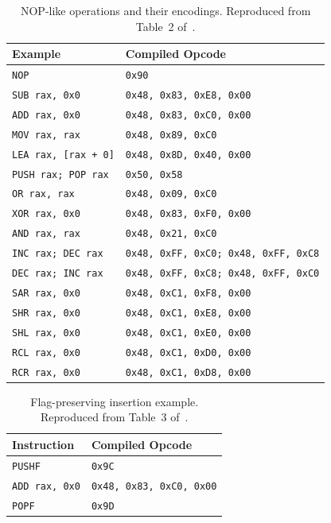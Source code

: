 \documentclass[runningheads]{llncs}
\begin{document}
\begin{table}[t]
    \caption{NOP-like operations and their encodings. Reproduced from Table~2 of~\cite{zone_secrypt_2026}.}
    \label{tab:nop_instructions}
    \small
    \centering
    \setlength{\tabcolsep}{3pt}
    \begin{tabular}{ll}
        \hline
        \textbf{Example} & \textbf{Compiled Opcode} \\ \hline
        \verb|NOP| & \verb|0x90| \\ \hline
        \verb|SUB rax, 0x0| & \verb|0x48, 0x83, 0xE8, 0x00| \\ \hline
        \verb|ADD rax, 0x0| & \verb|0x48, 0x83, 0xC0, 0x00| \\ \hline
        \verb|MOV rax, rax| & \verb|0x48, 0x89, 0xC0| \\ \hline
        \verb|LEA rax, [rax + 0]| & \verb|0x48, 0x8D, 0x40, 0x00| \\ \hline
        \verb|PUSH rax; POP rax| & \verb|0x50, 0x58| \\ \hline
        \verb|OR rax, rax| & \verb|0x48, 0x09, 0xC0| \\ \hline
        \verb|XOR rax, 0x0| & \verb|0x48, 0x83, 0xF0, 0x00| \\ \hline
        \verb|AND rax, rax| & \verb|0x48, 0x21, 0xC0| \\ \hline
        \verb|INC rax; DEC rax| & \verb|0x48, 0xFF, 0xC0; 0x48, 0xFF, 0xC8| \\ \hline
        \verb|DEC rax; INC rax| & \verb|0x48, 0xFF, 0xC8; 0x48, 0xFF, 0xC0| \\ \hline
        \verb|SAR rax, 0x0| & \verb|0x48, 0xC1, 0xF8, 0x00| \\ \hline
        \verb|SHR rax, 0x0| & \verb|0x48, 0xC1, 0xE8, 0x00| \\ \hline
        \verb|SHL rax, 0x0| & \verb|0x48, 0xC1, 0xE0, 0x00| \\ \hline
        \verb|RCL rax, 0x0| & \verb|0x48, 0xC1, 0xD0, 0x00| \\ \hline
        \verb|RCR rax, 0x0| & \verb|0x48, 0xC1, 0xD8, 0x00| \\ \hline
    \end{tabular}
\end{table}

\begin{table}[htbp]
    \centering
    \caption{Flag-preserving insertion example. Reproduced from Table~3 of~\cite{zone_secrypt_2026}.}
    \label{tab:flag_preserving_nop}
    \small
    \centering
    \setlength{\tabcolsep}{3pt}
    \begin{tabular}{ll}
        \hline
        \textbf{Instruction}    & \textbf{Compiled Opcode} \\ \hline
        \verb|PUSHF|             & \verb|0x9C|                \\ \hline
        \verb|ADD rax, 0x0|      & \verb|0x48, 0x83, 0xC0, 0x00| \\ \hline
        \verb|POPF|              & \verb|0x9D|                \\ \hline
    \end{tabular}
\end{table}
\end{document}

